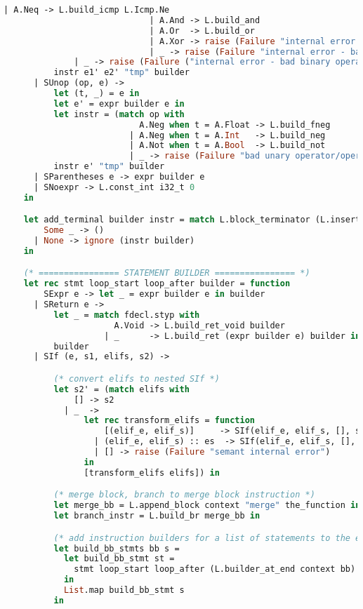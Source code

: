 \begin{lstlisting}[language=Caml,backgroundcolor=\color{backgroundcolor}]
                             | A.Neq -> L.build_icmp L.Icmp.Ne
                             | A.And -> L.build_and
                             | A.Or  -> L.build_or
                             | A.Xor -> raise (Failure "internal error - bad float operator")
                             | _ -> raise (Failure "internal error - bad bool operator"))
              | _ -> raise (Failure ("internal error - bad binary operator type"))) in
          instr e1' e2' "tmp" builder
      | SUnop (op, e) ->
          let (t, _) = e in
          let e' = expr builder e in
          let instr = (match op with
                           A.Neg when t = A.Float -> L.build_fneg
                         | A.Neg when t = A.Int   -> L.build_neg
                         | A.Not when t = A.Bool  -> L.build_not
                         | _ -> raise (Failure "bad unary operator/operand")) in
          instr e' "tmp" builder
      | SParentheses e -> expr builder e
      | SNoexpr -> L.const_int i32_t 0
    in

    let add_terminal builder instr = match L.block_terminator (L.insertion_block builder) with
        Some _ -> ()
      | None -> ignore (instr builder)
    in

    (* ================ STATEMENT BUILDER ================ *)
    let rec stmt loop_start loop_after builder = function
        SExpr e -> let _ = expr builder e in builder
      | SReturn e -> 
          let _ = match fdecl.styp with
                      A.Void -> L.build_ret_void builder
                    | _      -> L.build_ret (expr builder e) builder in
          builder
      | SIf (e, s1, elifs, s2) ->

          (* convert elifs to nested SIf *)
          let s2' = (match elifs with
              [] -> s2
            | _  -> 
                let rec transform_elifs = function
                    [(elif_e, elif_s)]     -> SIf(elif_e, elif_s, [], s2)
                  | (elif_e, elif_s) :: es  -> SIf(elif_e, elif_s, [], [transform_elifs es])
                  | [] -> raise (Failure "semant internal error")
                in
                [transform_elifs elifs]) in

          (* merge block, branch to merge block instruction *)
          let merge_bb = L.append_block context "merge" the_function in
          let branch_instr = L.build_br merge_bb in

          (* add instruction builders for a list of statements to the end of a basic block *)
          let build_bb_stmts bb s =
            let build_bb_stmt st =
              stmt loop_start loop_after (L.builder_at_end context bb) st
            in
            List.map build_bb_stmt s
          in


\end{lstlisting}
